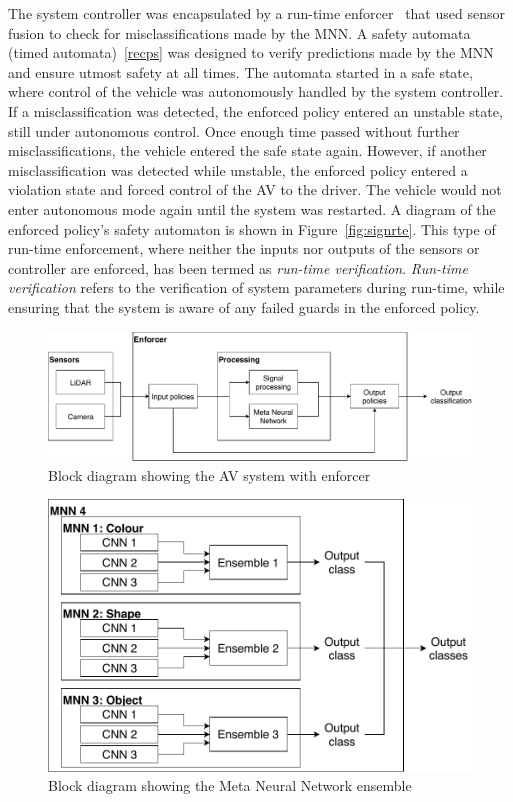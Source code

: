 The system controller was encapsulated by a run-time enforcer~\cite{recps} that used sensor fusion to check for misclassifications made by the \ac{MNN}.
A safety automata (timed automata)~\ref{recps} was designed to verify predictions made by the \ac{MNN} and ensure utmost safety at all times.
The automata started in a safe state, where control of the vehicle was autonomously handled by the system controller.
If a misclassification was detected, the enforced policy entered an unstable state, still under autonomous control. 
Once enough time passed without further misclassifications, the vehicle entered the safe state again.
However, if another misclassification was detected while unstable, the enforced policy entered a violation state and forced control of the \ac{AV} to the driver.
The vehicle would not enter autonomous mode again until the system was restarted.
A diagram of the enforced policy's safety automaton is shown in Figure~\ref{fig:signrte}.
This type of run-time enforcement, where neither the inputs nor outputs of the sensors or controller are enforced, has been termed as \textit{run-time verification}.
\textit{Run-time verification} refers to the verification of system parameters during run-time, while ensuring that the system is aware of any failed guards in the enforced policy.


\begin{figure}[t]
	\centering
	\includegraphics[scale=0.6]{Content/fig/SSNN.pdf}
	\caption{Block diagram showing the AV system with enforcer}
	\label{fig:ssnn}
\end{figure}

\begin{figure}[h]
	\centering
	\includegraphics[scale=0.9]{Content/fig/MNN.pdf}
	\caption{Block diagram showing the Meta Neural Network ensemble} \label{fig:mnn}
\end{figure}

